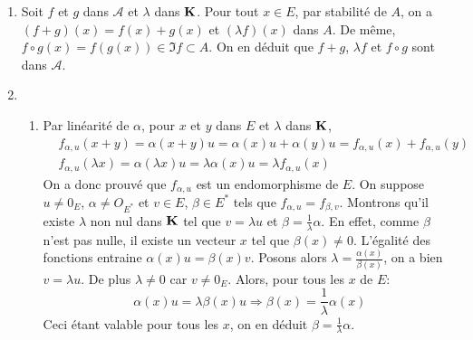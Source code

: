 \begin{enumerate}
 \item Soit $f$ et $g$ dans $\mathcal A$ et $\lambda$ dans $\mathbf{K}$. Pour tout $x\in E$, par stabilité de $A$, on a $(f+g)(x)=f(x)+g(x)$ et $(\lambda f)(x)$ dans $A$. De même, $f\circ g(x) = f(g(x))\in\Im f \subset A$. On en déduit que $f+g$, $\lambda f$ et $f\circ g$ sont dans $\mathcal A$.
 \item 
\begin{enumerate}
 \item Par linéarité de $\alpha$, pour $x$ et $y$ dans $E$ et $\lambda$ dans $\mathbf{K}$,
\begin{align*}
 &f_{\alpha, u}(x+y)=\alpha(x+y)u = \alpha(x)u + \alpha(y)u = f_{\alpha, u}(x) + f_{\alpha, u}(y)\\
 &f_{\alpha, u}(\lambda x) = \alpha(\lambda x)u = \lambda \alpha(x)u = \lambda f_{\alpha, u}(x)
\end{align*}
On a donc prouvé que $f_{\alpha, u}$ est un endomorphisme de $E$.\newline
On suppose $u\neq 0_E$, $\alpha \neq O_{E^*}$ et $v\in E$, $\beta\in E^*$ tels que  $f_{\alpha, u} = f_{\beta, v}$. Montrons qu'il existe $\lambda$ non nul dans $\mathbf{K}$ tel que $v=\lambda u$ et $\beta =\frac{1}{\lambda}\alpha$.\newline
En effet, comme $\beta$ n'est pas nulle, il existe un vecteur $x$ tel que $\beta(x)\neq0$. L'égalité des fonctions entraine $\alpha(x)u=\beta(x)v$. Posons alors $\lambda = \frac{\alpha(x)}{\beta(x)}$, on a bien $v=\lambda u$. De plus $\lambda\neq 0$ car $v\neq 0_E$. Alors, pour tous les $x$ de $E$:
\begin{displaymath}
 \alpha(x)u=\lambda\beta(x)u\Rightarrow \beta(x) = \frac{1}{\lambda}\alpha(x)
\end{displaymath}
Ceci étant valable pour tous les $x$, on en déduit $\beta = \frac{1}{\lambda}\alpha$.


\end{enumerate}
\end{enumerate}
